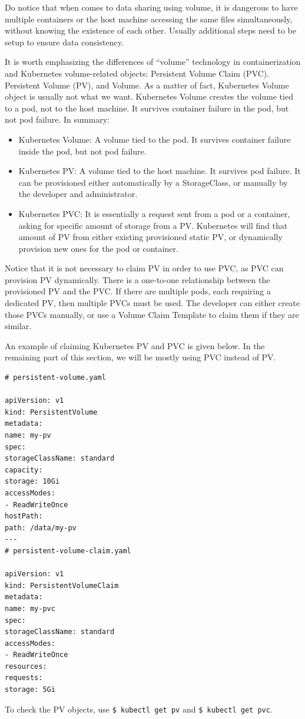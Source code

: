Do notice that when comes to data sharing using volume, it is dangerous to have multiple containers or the host machine accessing the same files simultaneously, without knowing the existence of each other. Usually additional steps need to be setup to ensure data consistency.

It is worth emphasizing the differences of ``volume'' technology in containerization and Kubernetes volume-related objects: Persistent Volume Claim (PVC). Persistent Volume (PV), and Volume. As a matter of fact, Kubernetes Volume object is usually not what we want. Kubernetes Volume creates the volume tied to a pod, not to the host machine. It survives container failure in the pod, but not pod failure. In summary:
\begin{itemize}
	\item Kubernetes Volume: A volume tied to the pod. It survives container failure inside the pod, but not pod failure.
	\item Kubernetes PV: A volume tied to the host machine. It survives pod failure. It can be provisioned either automatically by a StorageClass, or manually by the developer and administrator.
	\item Kubernetes PVC: It is essentially a request sent from a pod or a container, asking for specific amount of storage from a PV. Kubernetes will find that amount of PV from either existing provisioned static PV, or dynamically provision new ones for the pod or container.
\end{itemize}
Notice that it is not necessary to claim PV in order to use PVC, as PVC can provision PV dynamically. There is a one-to-one relationship between the provisioned PV and the PVC. If there are multiple pods, each requiring a dedicated PV, then multiple PVCs must be used. The developer can either create those PVCs manually, or use a Volume Claim Template to claim them if they are similar.

An example of claiming Kubernetes PV and PVC is given below. In the remaining part of this section, we will be mostly using PVC instead of PV.
\begin{lstlisting}
# persistent-volume.yaml

apiVersion: v1
kind: PersistentVolume
metadata:
name: my-pv
spec:
storageClassName: standard
capacity:
storage: 10Gi
accessModes:
- ReadWriteOnce
hostPath:
path: /data/my-pv
---
# persistent-volume-claim.yaml

apiVersion: v1
kind: PersistentVolumeClaim
metadata:
name: my-pvc
spec:
storageClassName: standard
accessModes:
- ReadWriteOnce
resources:
requests:
storage: 5Gi
\end{lstlisting}
To check the PV objects, use \verb|$ kubectl get pv| and \verb|$ kubectl get pvc|.

